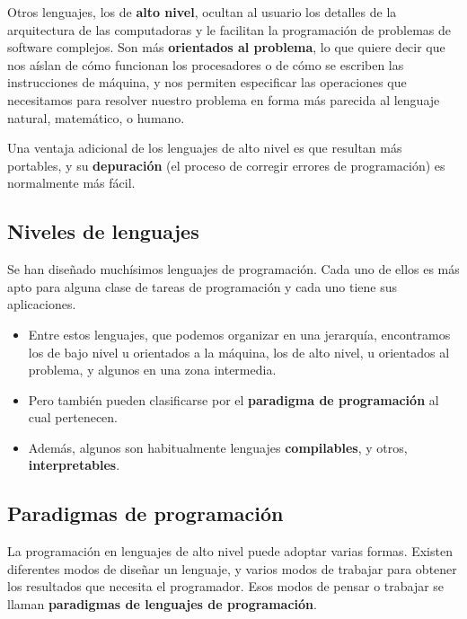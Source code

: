 \documentclass[spanish,a4paper,]{article}
\providecommand{\tightlist}{%
  \setlength{\itemsep}{0pt}\setlength{\parskip}{0pt}}
\begin{document}
Otros lenguajes, los de \textbf{alto nivel}, ocultan al usuario los
detalles de la arquitectura de las computadoras y le facilitan la
programación de problemas de software complejos. Son más
\textbf{orientados al problema}, lo que quiere decir que nos aíslan de
cómo funcionan los procesadores o de cómo se escriben las instrucciones
de máquina, y nos permiten especificar las operaciones que necesitamos
para resolver nuestro problema en forma más parecida al lenguaje
natural, matemático, o humano.

Una ventaja adicional de los lenguajes de alto nivel es que resultan más
portables, y su \textbf{depuración} (el proceso de corregir errores de
programación) es normalmente más fácil.

\hypertarget{niveles-de-lenguajes}{%
\subsection{Niveles de lenguajes}\label{niveles-de-lenguajes}}

Se han diseñado muchísimos lenguajes de programación. Cada uno de ellos
es más apto para alguna clase de tareas de programación y cada uno tiene
sus aplicaciones.

\begin{itemize}
\tightlist
\item
  Entre estos lenguajes, que podemos organizar en una jerarquía,
  encontramos los de bajo nivel u orientados a la máquina, los de alto
  nivel, u orientados al problema, y algunos en una zona intermedia.
\item
  Pero también pueden clasificarse por el \textbf{paradigma de
  programación} al cual pertenecen.
\item
  Además, algunos son habitualmente lenguajes \textbf{compilables}, y
  otros, \textbf{interpretables}.
\end{itemize}

\hypertarget{paradigmas-de-programaciuxf3n}{%
\subsection{Paradigmas de
programación}\label{paradigmas-de-programaciuxf3n}}

La programación en lenguajes de alto nivel puede adoptar varias formas.
Existen diferentes modos de diseñar un lenguaje, y varios modos de
trabajar para obtener los resultados que necesita el programador. Esos
modos de pensar o trabajar se llaman \textbf{paradigmas de lenguajes de
programación}.
\end{document}
